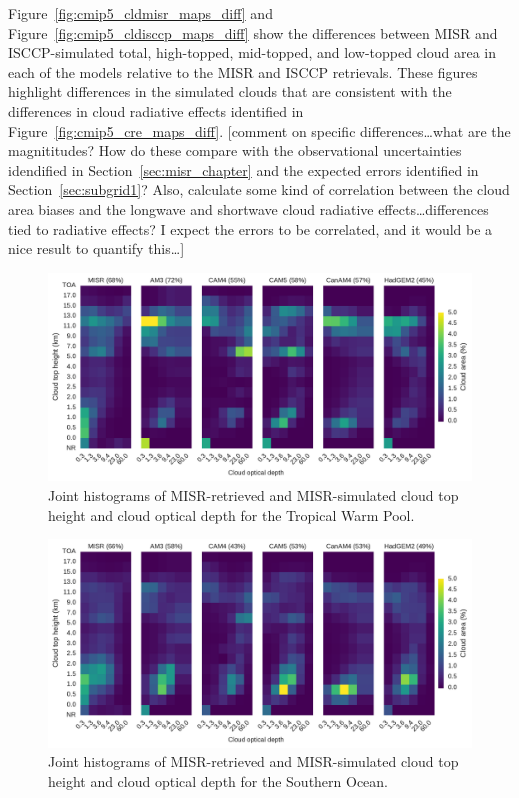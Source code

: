 Figure~\ref{fig:cmip5_cldmisr_maps_diff} and
Figure~\ref{fig:cmip5_cldisccp_maps_diff} show the differences between
MISR and ISCCP-simulated total, high-topped, mid-topped, and low-topped
cloud area in each of the models relative to the MISR and ISCCP
retrievals. These figures highlight differences in the simulated clouds
that are consistent with the differences in cloud radiative effects
identified in Figure~\ref{fig:cmip5_cre_maps_diff}. {[}comment on
specific differences\ldots{}what are the magnititudes? How do these
compare with the observational uncertainties idendified in
Section~\ref{sec:misr_chapter} and the expected errors identified in
Section~\ref{sec:subgrid1}? Also, calculate some kind of correlation
between the cloud area biases and the longwave and shortwave cloud
radiative effects\ldots{}differences tied to radiative effects? I expect
the errors to be correlated, and it would be a nice result to quantify
this\ldots{}{]}

\begin{figure}[htbp]
\centering
\includegraphics{graphics/cmip5_clMISR_TropicalWarmPool.pdf}
\caption{\label{fig:cmip5_clMISR_TropicalWarmPool}Joint histograms of
MISR-retrieved and MISR-simulated cloud top height and cloud optical
depth for the Tropical Warm
Pool.}\label{fig:cmip5ux5fclMISRux5fTropicalWarmPool}
\end{figure}

\begin{figure}[htbp]
\centering
\includegraphics{graphics/cmip5_clMISR_SouthernOcean.pdf}
\caption{\label{fig:cmip5_clMISR_SouthernOcean}Joint histograms of
MISR-retrieved and MISR-simulated cloud top height and cloud optical
depth for the Southern
Ocean.}\label{fig:cmip5ux5fclMISRux5fSouthernOcean}
\end{figure}

